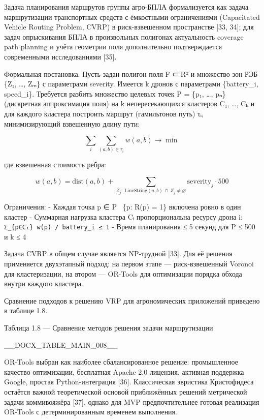 \documentclass[14pt,a4paper]{extarticle}
\begin{document}
Задача планирования маршрутов группы агро-БПЛА формализуется как задача маршрутизации транспортных средств с ёмкостными ограничениями (Capacitated Vehicle Routing Problem, CVRP) в риск-взвешенном пространстве {[}33, 34{]}; для задач опрыскивания БПЛА в произвольных полигонах актуальность coverage path planning и учёта геометрии поля дополнительно подтверждается современными исследованиями {[}35{]}.

Формальная постановка. Пусть задан полигон поля F ⊂ R² и множество зон РЭБ \{Z₁, \ldots, Zₘ\} с параметрами severity. Имеется k дронов с параметрами \{battery\_i, speed\_i\}. Требуется разбить множество целевых точек P = \{p₁, \ldots, pₙ\} (дискретная аппроксимация поля) на k непересекающихся кластеров C₁, \ldots, Cₖ и для каждого кластера построить маршрут (гамильтонов путь) τᵢ, минимизирующий взвешенную длину пути:

\[\sum_{i} \sum_{(a,b) \in \tau_i} w(a,b) \to \min\]

где взвешенная стоимость ребра:

\[w(a,b) = \mathrm{dist}(a,b) + \sum_{Z_j:\ \mathrm{LineString}(a,b)\, \cap\, Z_j \ne \varnothing} \mathrm{severity}_j \cdot 500\]

Ограничения: - Каждая точка p ∈ P ~\{p: R(p) = 1\} включена ровно в один кластер - Суммарная нагрузка кластера Cᵢ пропорциональна ресурсу дрона i: \texttt{Σ\_\{p∈Cᵢ\}\ w(p)\ /\ battery\_i\ ≤\ 1} - Время планирования ≤ 5 секунд для \textbar P\textbar{} ≤ 500 и k ≤ 4

Задача CVRP в общем случае является NP-трудной {[}33{]}. Для её решения применяется двухэтапный подход: на первом этапе --- риск-взвешенный Voronoi для кластеризации, на втором --- OR-Tools для оптимизации порядка обхода внутри каждого кластера.

Сравнение подходов к решению VRP для агрономических приложений приведено в таблице 1.8.

Таблица 1.8 --- Сравнение методов решения задачи маршрутизации



__DOCX_TABLE_MAIN_008__



OR-Tools выбран как наиболее сбалансированное решение: промышленное качество оптимизации, бесплатная Apache 2.0 лицензия, активная поддержка Google, простая Python-интеграция {[}36{]}. Классическая эвристика Кристофидеса остаётся важной теоретической основой приближённых решений метрической задачи коммивояжёра {[}37{]}, однако для MVP предпочтительнее готовая реализация OR-Tools с детерминированным временем выполнения.
\end{document}
